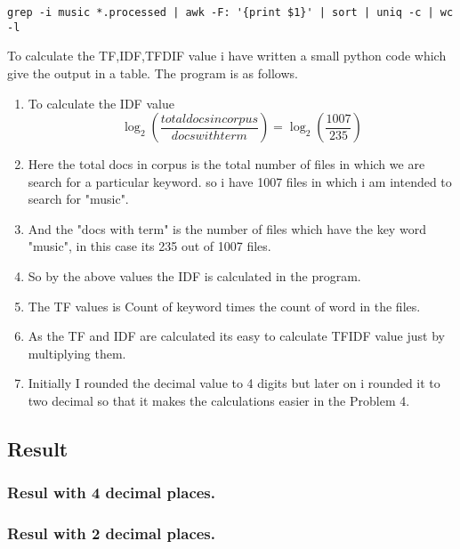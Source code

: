 \begin{lstlisting}[frame=single]
grep -i music *.processed | awk -F: '{print $1}' | sort | uniq -c | wc -l
\end{lstlisting}

To calculate the TF,IDF,TFDIF value i have written a small python code which give the output in a table. The program is as follows.



\begin{enumerate}

\item To calculate the IDF value \[
\log_2 \left( \frac{total docs in corpus}{docs with term} \right) = \log_2 \left( \frac{1007}{235} \right) 
\]
\item Here the total docs in corpus is the total number of files in which we are search for a particular keyword. so i have 1007 files in which i am intended to search for "music".
\item And the "docs with term" is the number of files which have the key word "music", in this case its 235 out of 1007 files. 
\item So by the above values the IDF is calculated in the program.
\item The TF values is Count of keyword times the count of word in the files. 
\item As the TF and IDF are calculated its easy to calculate TFIDF value just by multiplying them.
\item Initially I rounded the decimal value to 4 digits but later on i rounded it to two decimal so that it makes the calculations easier in the Problem 4. 
\end{enumerate}

\subsection{Result}
\subsubsection{Resul with 4 decimal places.}

\subsubsection{Resul with 2 decimal places.}





